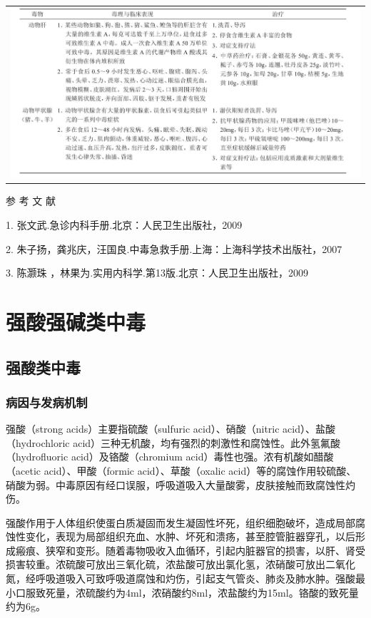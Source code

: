 \begin{longtable}{c}
 \includegraphics[width=\textwidth,height=\textheight,keepaspectratio]{./images/Image00235.jpg}
 \end{longtable}

\hypertarget{text00178.htmlux5cux23CHP5-8-7-1}{}
参 考 文 献

1. 张文武.急诊内科手册.北京：人民卫生出版社，2009

2. 朱子扬，龚兆庆，汪国良.中毒急救手册.上海：上海科学技术出版社，2007

3. 陈灏珠 ，林果为.实用内科学.第13版.北京：人民卫生出版社，2009

\protect\hypertarget{text00179.html}{}{}

\chapter{强酸强碱类中毒}

\section{强酸类中毒}

\subsection{病因与发病机制}

强酸（strong acids）主要指硫酸（sulfuric acid）、硝酸（nitric
acid）、盐酸（hydrochloric
acid）三种无机酸，均有强烈的刺激性和腐蚀性。此外氢氟酸（hydrofluoric
acid）及铬酸（chromium acid）毒性也强。浓有机酸如醋酸（acetic
acid）、甲酸（formic acid）、草酸（oxalic
acid）等的腐蚀作用较硫酸、硝酸为弱。中毒原因有经口误服，呼吸道吸入大量酸雾，皮肤接触而致腐蚀性灼伤。

强酸作用于人体组织使蛋白质凝固而发生凝固性坏死，组织细胞破坏，造成局部腐蚀性变化，表现为局部组织充血、水肿、坏死和溃疡，甚至腔管脏器穿孔，以后形成瘢痕、狭窄和变形。随着毒物吸收入血循环，引起内脏器官的损害，以肝、肾受损害较重。浓硫酸可放出三氧化硫，浓盐酸可放出氯化氢，浓硝酸可放出二氧化氮，经呼吸道吸入可致呼吸道腐蚀和灼伤，引起支气管炎、肺炎及肺水肿。强酸最小口服致死量，浓硫酸约为4ml，浓硝酸约8ml，浓盐酸约为15ml。铬酸的致死量约为6g。

